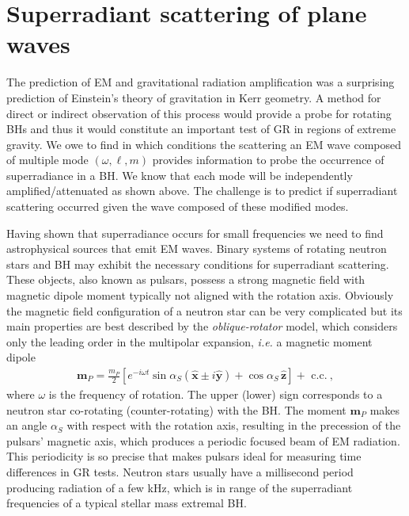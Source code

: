 
\chapter{Superradiant scattering of plane waves} %
\label{Chapter5}

The prediction of EM and gravitational radiation amplification was a surprising prediction of Einstein's theory of gravitation in Kerr geometry.
A method for direct or indirect observation of this process would provide a probe for rotating BHs and thus it would constitute an important test of GR in regions of extreme gravity.
We owe to find in which conditions the scattering an EM wave composed of multiple mode $(\omega,\ell, m)$ provides information to probe the occurrence of superradiance in a BH.
We know that each mode will be independently amplified/attenuated as shown above. The challenge is to predict if superradiant scattering occurred given the wave composed of these modified modes. 

Having shown that superradiance occurs for small frequencies we need to find astrophysical sources that emit EM waves.
Binary systems of rotating neutron stars and BH may exhibit the necessary conditions for superradiant scattering.
These objects, also known as pulsars, possess a strong magnetic field with magnetic dipole moment typically not aligned with the rotation axis.
Obviously the magnetic field configuration of a neutron star can be very complicated but its main properties are best described by the \emph{oblique-rotator} model, which considers only the leading order in the multipolar expansion, \emph{i.e.} a magnetic moment dipole
\begin{align}
    \mathbf{m}_P = \frac{m_P}{2} \left[ e^{-i \omega t} \sin\alpha_S ( \mathbf{\hat{x}} \pm i \mathbf{\hat{y}}) + \cos\alpha_S \,\mathbf{\hat{z}} \right] + \text{ c.c.} ~,
\end{align}
where $\omega$ is the frequency of rotation.
The upper (lower) sign corresponds to a neutron star co-rotating (counter-rotating) with the BH.
The moment $\mathbf{m}_P$ makes an angle $\alpha_S$ with respect with the rotation axis, resulting in the precession of the pulsars' magnetic axis, which produces a periodic focused beam of EM radiation.
This periodicity is so precise that makes pulsars ideal for measuring time differences in GR tests.
Neutron stars usually have a millisecond period producing radiation of a few kHz, which is in range of the superradiant frequencies of a typical stellar mass extremal BH.  

